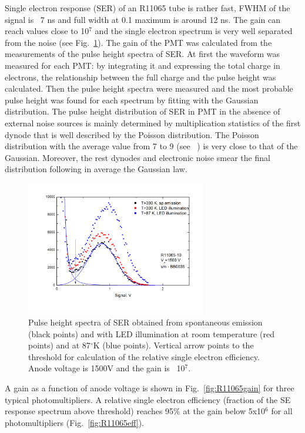 \documentclass[a4paper,11pt]{article}
\begin{document}
Single electron response (SER) of an R11065 tube is rather fast, FWHM of the signal is ~7 ns and full width at 0.1 maximum is around 12 ns.
The gain can reach values close to 10$^7$ and the single electron spectrum is very well separated from the noise (see Fig.~\ref{fig:R11065spectrum}). 
The gain of the PMT was calculated from the measurements of the pulse height spectra of SER. At first the waveform was measured for each  PMT: by integrating it and
expressing the total charge in electrons, the relationship between the full charge and the pulse height was calculated. Then the pulse height spectra were measured and the
most probable pulse height was found for each spectrum by fitting with the Gaussian distribution. The pulse height distribution of SER in PMT in the
absence of external noise sources is
mainly determined by multiplication statistics of the first dynode that is well described by the Poisson distribution. The Poisson distribution with
the average value from 7 to 9 (see ~\cite{CryoPMT1}) is very close to that of  the Gaussian. Moreover, the rest dynodes and electronic noise smear the final 
distribution following in average the Gaussian law.  
\begin{figure}[htbp]
\centering
\includegraphics[width=0.7\textwidth,viewport=1 1 700 500,clip]{figures/R11065spectrum.png}
\caption{Pulse height spectra of SER obtained from spontaneous emission (black points) and with LED illumination 
at room temperature (red points) and at 87$^{\circ}$K (blue points). Vertical arrow points to the threshold for calculation 
of the relative single electron efficiency. Anode voltage is 1500V and the  gain is ~10$^7$.
}
\label{fig:R11065spectrum}
\end{figure}
A gain as a function of anode voltage is shown in Fig.~\ref{fig:R11065gain} for three typical photomultipliers. A relative single electron efficiency 
(fraction of the SE response spectrum above threshold) reaches 95\% at the gain below 5x10$^6$ for all photomultipliers (Fig.~\ref{fig:R11065eff}).
\end{document}
